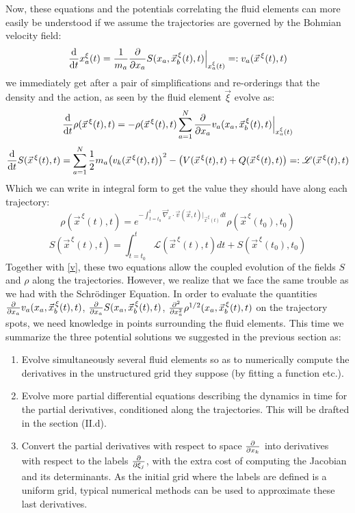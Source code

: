 \documentclass[11pt, a4paper]{article} %
\newcommand{\Lg}{\mathscr{L}}
\begin{document}
Now, these equations and the potentials correlating the fluid elements can more easily be understood if we assume the trajectories are governed by the Bohmian velocity field:
\begin{equation}\label{v}
\dv{}{t}x_a^\xi(t)=\frac{1}{m_a}\pdv{}{x_a}S(x_a, \vec{x}_b^{\, \xi}(t),t)\Big\rvert_{x^\xi_a(t)}=:v_a(\vec{x}^{\, \xi}(t),t)
\end{equation}
we immediately get after a pair of simplifications and re-orderings that the density and the action, as seen by the fluid element $\vec{\xi}$ evolve as:
\begin{equation}\label{CE.L}
\dv{}{t}\rho(\vec{x}^{\, \xi}(t),t)=-\rho(\vec{x}^{\, \xi}(t),t)\sum_{a=1}^N\pdv{}{x_a} v_a(x_a, \vec{x}_b^{\, \xi}(t),t)\Big\rvert_{x_a^\xi(t)}
\end{equation}
\begin{equation}\label{HJE.L}
\dv{}{t}S(\vec{x}^{\, \xi}(t),t)=  \sum_{a=1}^N \frac{1}{2} m_a \qty(v_k(\vec{x}^{\, \xi}(t),t) )^2 - \qty(V(\vec{x}^{\, \xi}(t),t)+ Q(\vec{x}^{\, \xi}(t),t))=: \Lg(\vec{x}^{\, \xi}(t),t)
\end{equation}
Which we can write in integral form to get the value they should have along each trajectory:
\begin{equation}\label{JacPre}
\rho(\vec{x}^{\, \xi}(t),t)=e^{-\int_{t=t_0}^t \vec{\nabla}_x\cdot \vec{v}(\vec{x},t)\rvert_{\vec{x}^{\, \xi}(t)} dt}\rho(\vec{x}^{\, \xi}(t_0),t_0)
\end{equation}
\begin{equation}\label{ActPre}
S(\vec{x}^{\, \xi}(t),t)=\int_{t=t_0}^t \Lg(\vec{x}^{\, \xi}(t),t) dt+S(\vec{x}^{\, \xi}(t_0),t_0)
\end{equation}
Together with \eqref{v}, these two equations allow the coupled evolution of the fields $S$ and $\rho$ along the trajectories. However, we realize that we face the same trouble as we had with the Schrödinger Equation. In order to evaluate the quantities $\pdv{}{x_a} v_a(x_a, \vec{x}_b^{\, \xi}(t),t)$, $\pdv{}{x_a}S(x_a, \vec{x}_b^{\, \xi}(t),t)$, $\pdv[2]{}{x_a}\rho^{1/2}(x_a, \vec{x}_b^{\, \xi}(t),t)$ on the trajectory spots, we need knowledge in points surrounding the fluid elements. This time we summarize the three potential solutions we suggested in the previous section as:
\begin{enumerate}
\item Evolve simultaneously several fluid elements so as to numerically compute the derivatives in the unstructured grid they suppose (by fitting a function etc.).
\item Evolve more partial differential equations describing the dynamics in time for the partial derivatives, conditioned along the trajectories. This will be drafted in the section (II.d).
\item Convert the partial derivatives with respect to space $\pdv{}{x_k}$ into derivatives with respect to the labels $\pdv{}{\xi_j}$, with the extra cost of computing the Jacobian and its determinants. As the initial grid where the labels are defined is a uniform grid, typical numerical methods can be used to approximate these last derivatives. \vspace{-0.25cm}
\end{enumerate}
\end{document}
